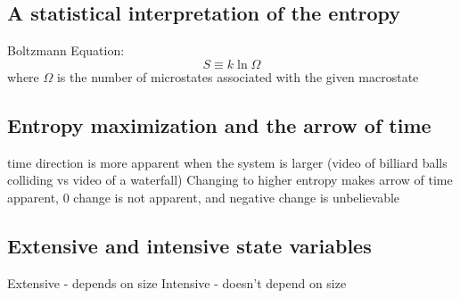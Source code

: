 \documentclass[twocolumn]{article}
\begin{document}
\subsection{A statistical interpretation of the entropy}
\begin{outline}
\1 Boltzmann Equation: \[S\equiv k\ln\Omega\] where $\Omega$ is the number of microstates associated with the given macrostate
\end{outline}
\subsection{Entropy maximization and the arrow of time}
\begin{outline}
\1 time direction is more apparent when the system is larger (video of billiard balls colliding vs video of a waterfall)
\1 Changing to higher entropy makes arrow of time apparent, 0 change is not apparent, and negative change is unbelievable
\end{outline}
\subsection{Extensive and intensive state variables}
\begin{outline}
\1 Extensive - depends on size
\1 Intensive - doesn't depend on size
\end{outline}
\end{document}

